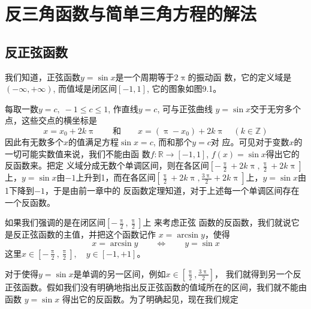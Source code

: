 \chapter{反三角函数与简单三角方程的解法}
\section{反正弦函数}
我们知道，正弦函数$y=\sin x$是一个周期等于$2\uppi$的振动函
数，它的定义域是$(-\infty,+\infty)$, 而值域是闭区间$[-1,1]$, 它的图象如图9.1。

\begin{figure}[htp]
    \centering
{}
    \caption{}
\end{figure}


每取一数$y=c,\; -1\leqslant c\leqslant 1$, 作直线$y=c$, 可与正弦曲线
$y=\sin x$交于无穷多个点，这些交点的横坐标是
\[x=x_0+2k\uppi\qquad \text{和}\qquad x=(\uppi -x_0)+2k\uppi\quad (k\in\mathbb{Z})\]
因此有无数多个$x$的值满足方程$\sin x =c$, 而和那个$y=c$对
应。可见对于变数$x$的一切可能实数值来说，我们不能由函
数$f:\mathbb{R}\to [-1,1]$, $f(x)=\sin x$得出它的反函数来。把定
义域分成无数个单调区间，则在各区间$\left[-\frac{\uppi}{2}+2k\uppi, \frac{\uppi}{2}+2k\uppi\right]$上，$y=\sin x$由$-1$上升到1，而在各区间$\left[\frac{\uppi}{2}+2k\uppi, \frac{3\uppi}{2}+2k\uppi\right]$上，$y=\sin x$由1下降到$-1$，于是由前一章中的
反函数定理知道，对于上述每一个单调区间存在一个反函数。

如果我们强调的是在闭区间$\left[-\frac{\uppi}{2},\frac{\uppi}{2}\right]$上
来考虑正弦
函数的反函数，我们就说它是反正弦函数的主值，并把这个函数记作
$x=\arcsin y$，使得
$$x=\arcsin y\qquad \Longleftrightarrow \qquad y=\sin x$$
这里$x\in \left[-\frac{\uppi}{2},\frac{\uppi}{2}\right],\quad y\in[-1,+1]$。

对于使得$y=\sin x$是单调的另一区间，例如$x\in \left[\frac{\uppi}{2},\frac{3\uppi}{2}\right]$，
我们就得到另一个反正弦函数。假如我们没有明确地指出反正弦函数的值域所在的区间，我们就不能由函数 $y=\sin x$ 得出它的反函数。为了明确起见，现在我们规定

